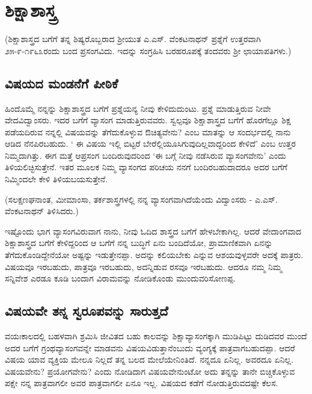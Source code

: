\chapter{ಶಿಕ್ಷಾಶಾಸ್ತ್ರ}

(ಶಿಕ್ಷಾಶಾಸ್ತ್ರದ ಬಗೆಗೆ ತನ್ನ ಶಿಷ್ಯರೊಬ್ಬರಾದ ಶ್ರೀಯುತ ಎ.ಎಸ್. ವೆಂಕಟನಾಥನ್ ಪ್ರಶ್ನೆಗೆ ಉತ್ತರವಾಗಿ  ೨೫-೯-೧೯೬೩ರಂದು ಬಂದ ಪ್ರಸಂಗವಿದು. ಇದನ್ನು  ಸಂಗ್ರಹಿಸಿ ಬರಹರೂಪಕ್ಕೆ  ತಂದವರು ಶ್ರೀ ಛಾಯಾಪತಿಗಳು.)

\section*{ವಿಷಯದ ಮಂಡನೆಗೆ ಪೀಠಿಕೆ}

ಹಿಂದೊಮ್ಮೆ  ನನ್ನನ್ನು  ಶಿಕ್ಷಾಶಾಸ್ತ್ರದ ಬಗೆಗೆ ಪ್ರಶ್ನೆಯನ್ಯ ನೀವು ಕೇಳಿದುದುಂಟು. ಪ್ರಶ್ನೆ ಮಾಡುತ್ತಿರುವ ನೀವೇ ವೇದವಿದ್ವಾಂಸರು. ಇದರ ಬಗೆಗೆ ವ್ಯಾಸಂಗ ಮಾಡುತ್ತಿರುವವರು. ಸ್ವಲ್ಪವೂ ಶಿಕ್ಷಾಶಾಸ್ತ್ರದ ಬಗೆಗೆ ಹೊರಗೆಲ್ಲೂ   ಶಿಕ್ಷ ಪಡೆಯದಿರುವ ನನ್ನಲ್ಲಿ  ವಿಷಯವನ್ನು  ತೆಗೆದುಕೊಳ್ಳುವ ಔಚಿತ್ಯವೇನು? ಎಂಬ ಮಾತನ್ನು  ಆ ಸಂದರ್ಭದಲ್ಲಿ  ನಾನು ಆಡಿದ ನೆನಪಿರಬಹುದು. ` ಈ ವಿಷಯ ಇಲ್ಲಿ ಬಿಟ್ಟರೆ ಬೇರೆಲ್ಲಿಯೂಸಿಗುವುದಿಲ್ಲವಾದ್ದರಿಂದ ಕೇಳಿದೆ'  ಎಂಬ ಉತ್ತರ ನಿಮ್ಮದಾಗಿತ್ತು. ಈಗ ಮತ್ತೆ ಆಪ್ರಸಂಗ ಬಂದಿರುವುದರಿಂದ   `ಈ ಬಗ್ಗೆ ನೀವು ನಡೆಸಿರುವ ವ್ಯಾಸಂಗವೇನು' ಎಂದು ತಿಳಿಯಲಿಚ್ಛಿಸುತ್ತೇನೆ.  ಇತರ ಮೂಲಕ ನಿಮ್ಮ ವ್ಯಾಸಂಗದ ಪರಿಚಯ ನನಗೆ ಬಂದಿರಬಹುದಾದರೂ ಅದರ ಬಗೆಗೆ ನಿಮ್ಮಿಂದಲೇ ಕೇಳಿ ತಿಳಿಯಬಯಸುತ್ತೇನೆ. 

(ಸಲಕ್ಷಣಘನಾಂತ, ಮೀಮಾಂಸಾ, ತರ್ಕಶಾಸ್ತ್ರಗಳಲ್ಲಿ ನನ್ನ ವ್ಯಾಸಂಗವಾಗಿದೆಯೆಂದು ವಿದ್ವಾಂಸರು - ಎ.ಎಸ್. ವೆಂಕಟನಾಥನ್ ತಿಳಿಸಿದರು.)

ಇಷ್ಟೊಂದು ಭಾಗ ವ್ಯಾಸಂಗವಿರುವಾಗ ನಾನು, ನೀವು ಓದಿದ ಶಾಸ್ತ್ರದ ಬಗೆಗೆ ಹೇಳಬೇಕಾಗಿಲ್ಲ. ಆದರೆ ವೇದಾಂಗವಾದ ಶಿಕ್ಷಾಶಾಸ್ತ್ರದ ಬಗೆಗೆ ಕೇಳಿದ್ದರಿಂದ ಆ ಬಗೆಗೆ ನನ್ನ ಬುದ್ಧಿಗೆ ಏನು ಬಂದಿದೆಯೋ, ಪ್ರಾಮಾಣಿಕವಾಗಿ ಏನನ್ನು  ತೆಗೆದುಕೊಂಡಿದ್ದೇನೆಯೋ ಅಷ್ಟನ್ನು ಇಡುತ್ತೇನಪ್ಪಾ. ಅದನ್ನು ಕಲಿಯಬೇಕು ಎನ್ನುವ ಆಶಯವುಳ್ಳವರೇ ಅದಕ್ಕೆ ಪಾತ್ರರು. ವಿಷಯವೂ ಇರಬಹುದು, ಪಾತ್ರವೂ  ಇರಬಹುದು, ಅದನ್ನಿಡುವ ರಸವೂ ಇರಬಹುದು. ಆದರೂ ನಮ್ಮ ನಿಮ್ಮ ಸನ್ನಿವೇಶ ಎರಡೂ ಕೂಡಿ ಬಂದಾಗ ವಿರಾಮವನ್ನು ನೋಡಿಕೊಂಡು ಮುಂದುವರಿಸೋಣಪ್ಪ.

\section*{ವಿಷಯವೇ ತನ್ನ ಸ್ವರೂಪವನ್ನು  ಸಾರುತ್ತದೆ}

ವಯಃಕಾಲದಲ್ಲಿ  ಬಹಳವಾಗಿ ಶ್ರಮಿಸಿ ಜೀವಿತದ ಬಹು ಕಾಲವನ್ನು  ಶಿಕ್ಷಾವ್ಯಾಸಂಗಕ್ಕಾಗಿ ಮುಡಿಪಿಟ್ಟು  ದುಡಿದವರ ಮುಂದೆ ಅದರ ಬಗೆಗೆ ಗ್ರಂಥವ್ಯಾಸಂಗವನ್ನೇ ಮಾಡವನು ವಿಷಯವಿಡುತ್ತಾನೆಂಬುದು ವ್ಯಂಗ್ಯಕ್ಕೆ  ಪಾತ್ರವಾಗಬಹುದಪ್ಪಾ. ಆದರೆ ವಿಷಯ ಯಾವ ವ್ಯಕ್ತಿಯ ಮೇಲೂ ನಿಲ್ಲದೆ ತನ್ನ ಬಲದ ಮೇಲೆಯೇನಿಂತಿದೆ. ನನ್ನದೂ ಏನಿಲ್ಲ. ಅವರದೂ ಏನಿಲ್ಲ. ವಿಷಯವೇನು? ಪ್ರಯೋಗವೇನು? ಎಂದು ನೋಡಿದಾಗ ವಿಷಯವೇನುಂಟೋ ಅದು ತನ್ನನ್ನು ತಾನೇ ಬಿಚ್ಚಿಕೊಳ್ಳುವ ಪಕ್ಷೇ ನನ್ನ ಪಾತ್ರವಾಗಲೀ ಅವರ ಪಾತ್ರವಾಗಲೀ ಏನೂ ಇಲ್ಲ. ವಿಷಯದ ಕಡೆಗೆ ನೋಡುತ್ತಿರುವದಷ್ಟೇ ಕೆಲಸ.

